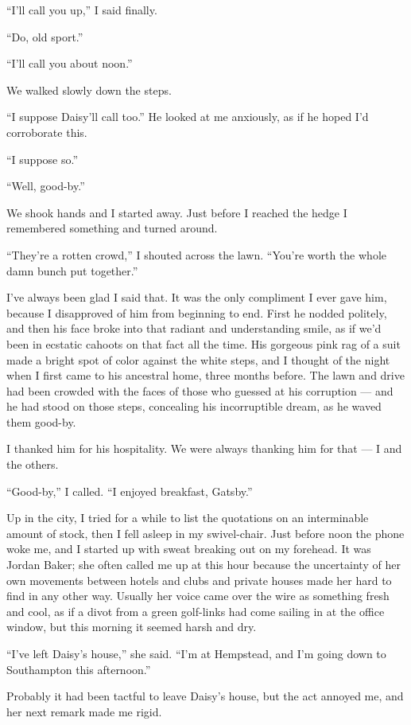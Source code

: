 \documentclass{znotebook}
\begin{document}
``I’ll call you up,'' I said finally.

``Do, old sport.''

``I’ll call you about noon.''

We walked slowly down the steps.

``I suppose Daisy’ll call too.'' He looked at me anxiously, as if he hoped I’d corroborate this.

``I suppose so.''

``Well, good-by.''

We shook hands and I started away. Just before I reached the hedge I remembered something and turned around.

``They’re a rotten crowd,'' I shouted across the lawn. ``You’re worth the whole damn bunch put together.''

I’ve always been glad I said that. It was the only compliment I ever gave him, because I disapproved of him from beginning to end. First he nodded politely, and then his face broke into that radiant and understanding smile, as if we’d been in ecstatic cahoots on that fact all the time. His gorgeous pink rag of a suit made a bright spot of color against the white steps, and I thought of the night when I first came to his ancestral home, three months before. The lawn and drive had been crowded with the faces of those who guessed at his corruption — and he had stood on those steps, concealing his incorruptible dream, as he waved them good-by.

I thanked him for his hospitality. We were always thanking him for that — I and the others.

``Good-by,'' I called. ``I enjoyed breakfast, Gatsby.''

Up in the city, I tried for a while to list the quotations on an interminable amount of stock, then I fell asleep in my swivel-chair. Just before noon the phone woke me, and I started up with sweat breaking out on my forehead. It was Jordan Baker; she often called me up at this hour because the uncertainty of her own movements between hotels and clubs and private houses made her hard to find in any other way. Usually her voice came over the wire as something fresh and cool, as if a divot from a green golf-links had come sailing in at the office window, but this morning it seemed harsh and dry.

``I’ve left Daisy’s house,'' she said. ``I’m at Hempstead, and I’m going down to Southampton this afternoon.''

Probably it had been tactful to leave Daisy’s house, but the act annoyed me, and her next remark made me rigid.
\end{document}

